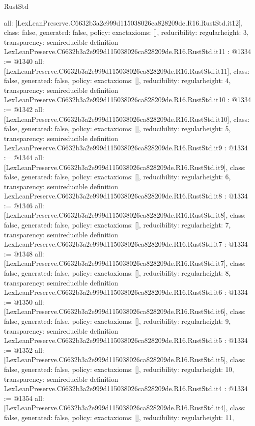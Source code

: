 \begin{lexlean}{RustStd}
\begin{coremodule}
{  all: [LexLeanPreserve.C6632b3a2e999d115038026ca828209de.R16.RustStd.it12],
  class: false,
  generated: false,
  policy: exact{axioms: []},
  reducibility: regular{height: 3},
  transparency: semireducible
}
definition LexLeanPreserve.C6632b3a2e999d115038026ca828209de.R16.RustStd.it11 : @1334 := @1340 {
  all: [LexLeanPreserve.C6632b3a2e999d115038026ca828209de.R16.RustStd.it11],
  class: false,
  generated: false,
  policy: exact{axioms: []},
  reducibility: regular{height: 4},
  transparency: semireducible
}
definition LexLeanPreserve.C6632b3a2e999d115038026ca828209de.R16.RustStd.it10 : @1334 := @1342 {
  all: [LexLeanPreserve.C6632b3a2e999d115038026ca828209de.R16.RustStd.it10],
  class: false,
  generated: false,
  policy: exact{axioms: []},
  reducibility: regular{height: 5},
  transparency: semireducible
}
definition LexLeanPreserve.C6632b3a2e999d115038026ca828209de.R16.RustStd.it9 : @1334 := @1344 {
  all: [LexLeanPreserve.C6632b3a2e999d115038026ca828209de.R16.RustStd.it9],
  class: false,
  generated: false,
  policy: exact{axioms: []},
  reducibility: regular{height: 6},
  transparency: semireducible
}
definition LexLeanPreserve.C6632b3a2e999d115038026ca828209de.R16.RustStd.it8 : @1334 := @1346 {
  all: [LexLeanPreserve.C6632b3a2e999d115038026ca828209de.R16.RustStd.it8],
  class: false,
  generated: false,
  policy: exact{axioms: []},
  reducibility: regular{height: 7},
  transparency: semireducible
}
definition LexLeanPreserve.C6632b3a2e999d115038026ca828209de.R16.RustStd.it7 : @1334 := @1348 {
  all: [LexLeanPreserve.C6632b3a2e999d115038026ca828209de.R16.RustStd.it7],
  class: false,
  generated: false,
  policy: exact{axioms: []},
  reducibility: regular{height: 8},
  transparency: semireducible
}
definition LexLeanPreserve.C6632b3a2e999d115038026ca828209de.R16.RustStd.it6 : @1334 := @1350 {
  all: [LexLeanPreserve.C6632b3a2e999d115038026ca828209de.R16.RustStd.it6],
  class: false,
  generated: false,
  policy: exact{axioms: []},
  reducibility: regular{height: 9},
  transparency: semireducible
}
definition LexLeanPreserve.C6632b3a2e999d115038026ca828209de.R16.RustStd.it5 : @1334 := @1352 {
  all: [LexLeanPreserve.C6632b3a2e999d115038026ca828209de.R16.RustStd.it5],
  class: false,
  generated: false,
  policy: exact{axioms: []},
  reducibility: regular{height: 10},
  transparency: semireducible
}
definition LexLeanPreserve.C6632b3a2e999d115038026ca828209de.R16.RustStd.it4 : @1334 := @1354 {
  all: [LexLeanPreserve.C6632b3a2e999d115038026ca828209de.R16.RustStd.it4],
  class: false,
  generated: false,
  policy: exact{axioms: []},
  reducibility: regular{height: 11},
}
\end{coremodule}
\end{lexlean}
